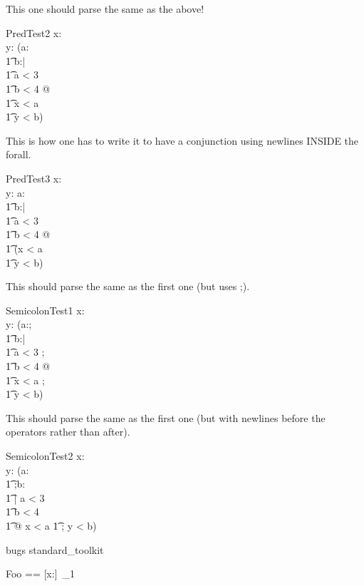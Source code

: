 \documentclass{article}
\begin{document}
This one should parse the same as the above!
\begin{schema}{PredTest2}
   x:\nat \\
   y:\nat
\where
   (\forall a:\nat \\
   \t1      b:\nat | \\
   \t1     a < 3 \\
   \t1     b < 4 @ \\
   \t1   x < a \\
   \t1   y < b)
\end{schema}

This is how one has to write it to have a conjunction using newlines
INSIDE the forall.
\begin{schema}{PredTest3}
   x:\nat \\
   y:\nat
\where
   \forall a:\nat \\
   \t1      b:\nat | \\
   \t1     a < 3 \\
   \t1     b < 4 @ \\
   \t1   (x < a \\
   \t1   y < b)
\end{schema}

This should parse the same as the first one (but uses ;).
\begin{schema}{SemicolonTest1}
   x:\nat \\
   y:\nat
\where
   (\forall a:\nat; \\
   \t1      b:\nat | \\
   \t1     a < 3 ; \\
   \t1     b < 4 @ \\
   \t1   x < a ; \\
   \t1   y < b)
\end{schema}

This should parse the same as the first one (but with newlines before
the operators rather than after).
\begin{schema}{SemicolonTest2}
   x:\nat \\
   y:\nat
\where
   (\forall a:\nat \\
   \t1      ;b:\nat \\
   \t1   | a < 3 \\
   \t1     b < 4 \\
   \t1   @ x < a
   \t1   ; y < b)
\end{schema}


\begin{zsection}
\SECTION bugs \parents standard\_toolkit
\end{zsection}

\begin{zed}
  Foo == [x:\nat]~_1
\end{zed}
\end{document}
